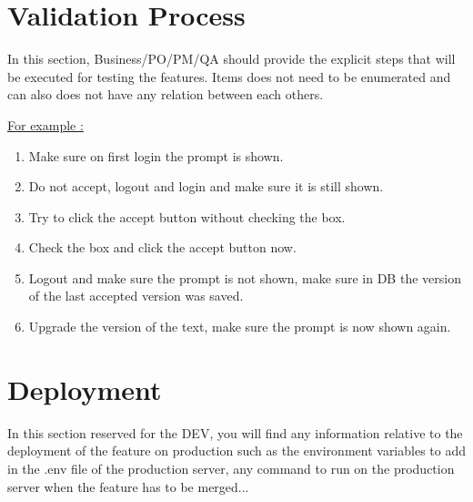 \documentclass[a4paper,article,oneside]{memoir}
\begin{document}
        \section{Validation Process}
        In this section, \gls{Business}/\gls{PO}/\gls{PM}/\gls{QA} should provide the explicit steps that will be executed for testing the features. Items does not need to be enumerated and can also does not have any relation between each others.
        
        \underline{For example :}
                \begin{enumerate}
  			\item Make sure on first login the prompt is shown.
  			\item Do not accept, logout and login and make sure it is still shown.
  			\item Try to click the accept button without checking the box.
  			 \item Check the box and click the accept button now.
  			 \item Logout and make sure the prompt is not shown, make sure in DB the version of the last accepted version was saved.
  			 \item Upgrade the version of the text, make sure the prompt is now shown again.
		\end{enumerate}
        \section{Deployment}
        In this section reserved for the \gls{DEV}, you will find any information relative to the deployment of the feature on production such as the environment variables to add in the .env file of the production server, any command to run on the production server when the feature has to be merged... 

\printglossary[nonumberlist]
\end{document}
